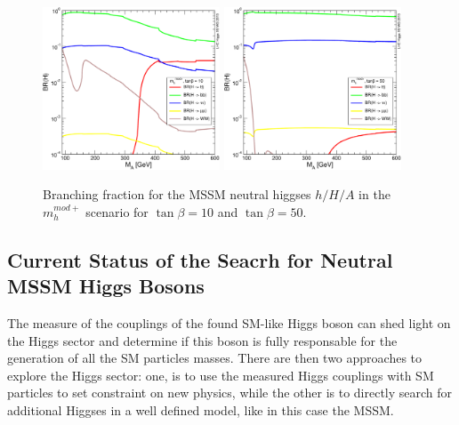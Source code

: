 \begin{figure}[tp]
\begin{center}
            \includegraphics[width=0.47\textwidth]{figure/BR_higgs/YRHXS3_BR_fig37.pdf}
            \includegraphics[width=0.47\textwidth]{figure/BR_higgs/YRHXS3_BR_fig38.pdf}

    \end{center}
    \caption{Branching fraction for the MSSM neutral higgses $h/H/A$ in the $m_h^{mod+}$ scenario for $\tan\beta=10$ and
	$\tan\beta=50$.}
   \label{fig:br}

\end{figure}



\subsection{Current Status of the Seacrh for Neutral MSSM Higgs Bosons}

The measure of the couplings of the found SM-like Higgs boson can shed light on the Higgs sector and determine if this boson
is fully responsable for the generation of all the SM particles masses. 
There are then two approaches to explore the Higgs sector: one, is to use the measured Higgs couplings with SM particles to 
set constraint on new physics, while the other is to directly search for additional Higgses in a well defined model, like in this case the MSSM.

